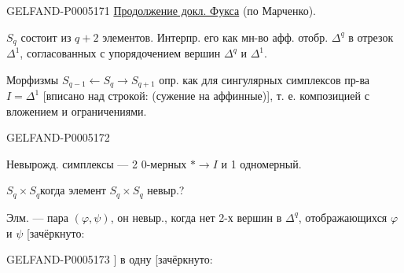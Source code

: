 \begin{GelfandAdjacentEvidence}{GELFAND-P000517}{1}
\uline{Продолжение докл. Фукса} (по Марченко).


$S_q$ состоит из $q+2$ элементов. Интерпр. его как мн-во афф. отобр.
$\Delta^q$ в отрезок $\Delta^1$, согласованных с упорядочением вершин $\Delta^q$ и $\Delta^1$.

Морфизмы $S_{q-1}\leftarrow S_q\to S_{q+1}$ опр. как для сингулярных симплексов пр-ва
$I=\Delta^1$ [вписано над строкой: (сужение на аффинные)], т. е. композицией с вложением и ограничениями.
\end{GelfandAdjacentEvidence}
\begin{GelfandAdjacentEvidence}{GELFAND-P000517}{2}


Невырожд. симплексы — 2 0-мерных $*\to I$ и 1 одномерный.

$S_q\times S_q$\qquad когда элемент $S_q\times S_q$ невыр.?

Элм. — пара $(\varphi,\psi)$, он невыр., когда нет 2-х вершин в $\Delta^q$,
отображающихся $\varphi$ и $\psi$ [зачёркнуто:
\end{GelfandAdjacentEvidence}
\begin{GelfandAdjacentEvidence}{GELFAND-P000517}{3}
]
в одну [зачёркнуто:
\end{GelfandAdjacentEvidence}
